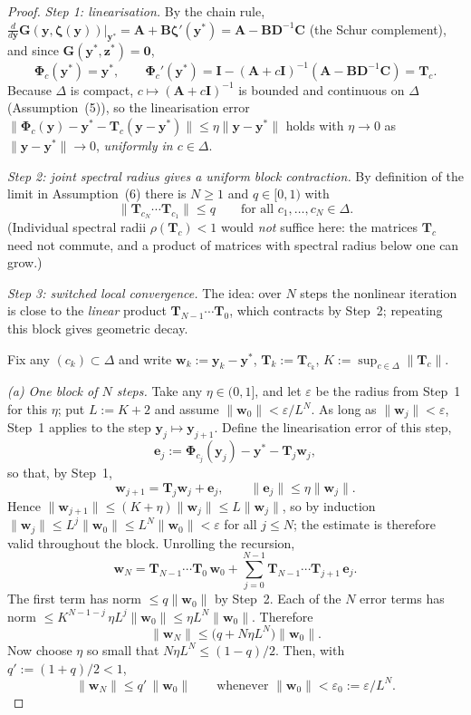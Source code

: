 \documentclass[11pt,a4paper]{article}
\begin{document}
\begin{proof}
\emph{Step 1: linearisation.} By the chain rule,
$\frac{d}{d\mathbf y}\mathbf G(\mathbf y,\boldsymbol\zeta(\mathbf y))\big|_{\mathbf y^*}
=\mathbf A+\mathbf B\boldsymbol\zeta'(\mathbf y^*)=\mathbf A-\mathbf B\mathbf D^{-1}\mathbf C$
(the Schur complement), and since $\mathbf G(\mathbf y^*,\mathbf z^*)=\mathbf 0$,
\[
\boldsymbol\Phi_c(\mathbf y^*)=\mathbf y^*,\qquad
\boldsymbol\Phi_c'(\mathbf y^*)
=\mathbf I-(\mathbf A+c\mathbf I)^{-1}(\mathbf A-\mathbf B\mathbf D^{-1}\mathbf C)=\mathbf T_c .
\]
Because $\Delta$ is compact, $c\mapsto(\mathbf A+c\mathbf I)^{-1}$ is bounded and continuous on
$\Delta$ (Assumption~(5)), so the linearisation error
$\|\boldsymbol\Phi_c(\mathbf y)-\mathbf y^*-\mathbf T_c(\mathbf y-\mathbf y^*)\|
\le\eta\|\mathbf y-\mathbf y^*\|$ holds with $\eta\to0$ as $\|\mathbf y-\mathbf y^*\|\to0$,
\emph{uniformly in $c\in\Delta$}.

\emph{Step 2: joint spectral radius gives a uniform block contraction.}
By definition of the limit in Assumption~(6) there is $N\ge1$ and $q\in[0,1)$ with
\[
\bigl\|\mathbf T_{c_N}\cdots\mathbf T_{c_1}\bigr\|\le q
\qquad\text{for all }c_1,\dots,c_N\in\Delta .
\]
(Individual spectral radii $\rho(\mathbf T_c)<1$ would \emph{not} suffice here: the matrices
$\mathbf T_c$ need not commute, and a product of matrices with spectral radius below one can
grow.)

\emph{Step 3: switched local convergence.} The idea: over $N$ steps the nonlinear iteration
is close to the \emph{linear} product $\mathbf T_{N-1}\cdots\mathbf T_0$, which contracts by Step~2;
repeating this block gives geometric decay.

Fix any $(c_k)\subset\Delta$ and write $\mathbf w_k:=\mathbf y_k-\mathbf y^*$,
$\mathbf T_k:=\mathbf T_{c_k}$, $K:=\sup_{c\in\Delta}\|\mathbf T_c\|$.

\emph{(a) One block of $N$ steps.} Take any $\eta\in(0,1]$, and let $\varepsilon$ be the radius from
Step~1 for this $\eta$; put $L:=K+2$ and assume $\|\mathbf w_0\|<\varepsilon/L^{N}$. As long as
$\|\mathbf w_j\|<\varepsilon$, Step~1 applies to the step $\mathbf y_j\mapsto\mathbf y_{j+1}$.
Define the linearisation error of this step,
\[
\mathbf e_j:=\boldsymbol\Phi_{c_j}(\mathbf y_j)-\mathbf y^*-\mathbf T_j\mathbf w_j,
\]
so that, by Step~1,
\[
\mathbf w_{j+1}=\mathbf T_j\mathbf w_j+\mathbf e_j,\qquad\|\mathbf e_j\|\le\eta\|\mathbf w_j\| .
\]
Hence $\|\mathbf w_{j+1}\|\le(K+\eta)\|\mathbf w_j\|\le L\|\mathbf w_j\|$, so by induction
$\|\mathbf w_j\|\le L^{j}\|\mathbf w_0\|\le L^{N}\|\mathbf w_0\|<\varepsilon$ for all $j\le N$; the
estimate is therefore valid throughout the block. Unrolling the recursion,
\[
\mathbf w_N=\mathbf T_{N-1}\cdots\mathbf T_0\,\mathbf w_0+\sum_{j=0}^{N-1}\mathbf T_{N-1}\cdots\mathbf T_{j+1}\,\mathbf e_j .
\]
The first term has norm $\le q\|\mathbf w_0\|$ by Step~2. Each of the $N$ error terms has norm
$\le K^{N-1-j}\,\eta L^{j}\|\mathbf w_0\|\le\eta L^{N}\|\mathbf w_0\|$. Therefore
\[
\|\mathbf w_N\|\le\bigl(q+N\eta L^{N}\bigr)\|\mathbf w_0\| .
\]
Now choose $\eta$ so small that $N\eta L^{N}\le(1-q)/2$. Then, with $q':=(1+q)/2<1$,
\[
\|\mathbf w_N\|\le q'\,\|\mathbf w_0\|
\qquad\text{whenever }\|\mathbf w_0\|<\varepsilon_0:=\varepsilon/L^{N}.
\]


\end{proof}
\end{document}
